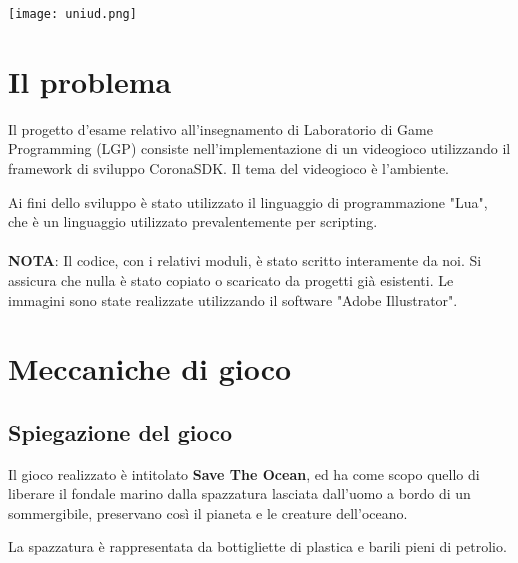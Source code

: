 \documentclass[12pt]{article}
\begin{document}
\begin{titlepage}



\texttt{[image: uniud.png]}\\[1cm] %
 

\vfill %

\end{titlepage}
\tableofcontents
\clearpage
\section{Il problema}
Il progetto d’esame relativo all’insegnamento di Laboratorio di Game Programming (LGP) consiste nell’implementazione di un videogioco utilizzando il framework di sviluppo CoronaSDK. Il tema del videogioco è l'ambiente. 

Ai fini dello sviluppo è stato utilizzato il linguaggio di programmazione "Lua", che è un linguaggio utilizzato prevalentemente per scripting.
\\\\
\textbf{NOTA}: Il codice, con i relativi moduli, è stato scritto interamente da noi. Si assicura che nulla è stato copiato o scaricato da progetti già esistenti. Le immagini sono state realizzate utilizzando il software "Adobe Illustrator".

\section{Meccaniche di gioco}
\subsection{Spiegazione del gioco}
Il gioco realizzato è intitolato \textbf{Save The Ocean}, ed ha come scopo quello di liberare il fondale marino dalla spazzatura lasciata dall'uomo a bordo di un sommergibile, preservano così il pianeta e le creature dell'oceano.

La spazzatura è rappresentata da bottigliette di plastica e barili pieni di petrolio.
\\
\end{document}
